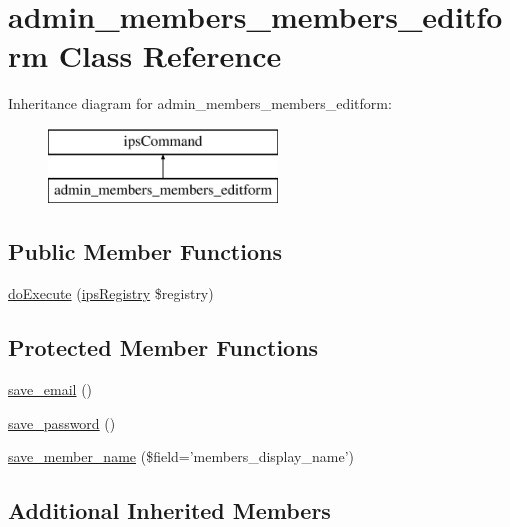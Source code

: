 \hypertarget{classadmin__members__members__editform}{\section{admin\-\_\-members\-\_\-members\-\_\-editform Class Reference}
\label{classadmin__members__members__editform}
}
Inheritance diagram for admin\-\_\-members\-\_\-members\-\_\-editform\-:\begin{figure}[H]
\begin{center}
\leavevmode
\includegraphics[height=2.000000cm]{classadmin__members__members__editform}
\end{center}
\end{figure}
\subsection*{Public Member Functions}
\begin{DoxyCompactItemize}
\item 
\hyperlink{classadmin__members__members__editform_afbc4e912a0604b94d47d66744c64d8ba}{do\-Execute} (\hyperlink{classips_registry}{ips\-Registry} \$registry)
\end{DoxyCompactItemize}
\subsection*{Protected Member Functions}
\begin{DoxyCompactItemize}
\item 
\hyperlink{classadmin__members__members__editform_a7daf4df74ad53f7e827903d35c56428d}{save\-\_\-email} ()
\item 
\hyperlink{classadmin__members__members__editform_ab6a4e744b69143824d08fa9736a3e26f}{save\-\_\-password} ()
\item 
\hyperlink{classadmin__members__members__editform_a424cc79586c1567933fb44e31e2366ef}{save\-\_\-member\-\_\-name} (\$field='members\-\_\-display\-\_\-name')
\end{DoxyCompactItemize}
\subsection*{Additional Inherited Members}


